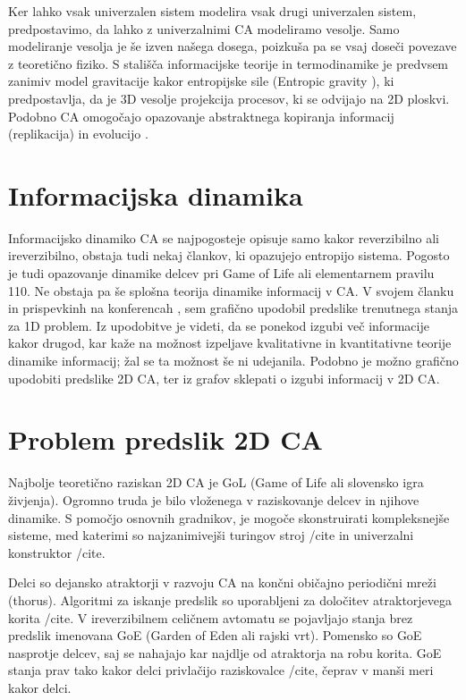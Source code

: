\documentclass[12pt,a4paper,openany]{book}
\begin{document}
Ker lahko vsak univerzalen sistem modelira vsak drugi univerzalen sistem, predpostavimo,
da lahko z univerzalnimi CA modeliramo vesolje. Samo modeliranje vesolja
je še izven našega dosega, poizkuša pa se vsaj doseči povezave z teoretično fiziko.
S stališča informacijske teorije in termodinamike je predvsem zanimiv model gravitacije
kakor entropijske sile (Entropic gravity \cite{Verlinde2010}), ki predpostavlja, da je
3D vesolje projekcija procesov, ki se odvijajo na 2D ploskvi. Podobno CA omogočajo
opazovanje abstraktnega kopiranja informacij (replikacija) in evolucijo \cite{Salzberg2004}.

\section{Informacijska dinamika}

Informacijsko dinamiko CA se najpogosteje opisuje samo kakor reverzibilno ali ireverzibilno,
obstaja tudi nekaj člankov, ki opazujejo entropijo sistema.
Pogosto je tudi opazovanje dinamike delcev pri Game of Life ali elementarnem pravilu 110.
Ne obstaja pa še splošna teorija dinamike informacij v CA.
V svojem članku \cite{JerasDobnikar2007} in prispevkinh na konferencah \cite{DBLP:conf/iccS/JerasD06, DBLP:conf/automata/Jeras08},
sem grafično upodobil predslike trenutnega stanja za 1D problem.
Iz upodobitve je videti, da se ponekod izgubi več informacije kakor drugod,
kar kaže na možnost izpeljave kvalitativne in kvantitativne teorije dinamike informacij;
žal se ta možnost še ni udejanila. Podobno je možno grafično upodobiti predslike 2D CA,
ter iz grafov sklepati o izgubi informacij v 2D CA.

\section{Problem predslik 2D CA}

Najbolje teoretično raziskan 2D CA je GoL (Game of Life ali slovensko igra živjenja).
Ogromno truda je bilo vloženega v raziskovanje delcev in njihove dinamike. S pomočjo
osnovnih gradnikov, je mogoče skonstruirati kompleksnejše sisteme, med katerimi so
najzanimivejši turingov stroj /cite{} in univerzalni konstruktor /cite{}.

Delci so dejansko atraktorji v razvoju CA na končni običajno periodični mreži (thorus).
Algoritmi za iskanje predslik so uporabljeni za določitev atraktorjevega korita /cite{}.
V ireverzibilnem celičnem avtomatu se pojavljajo stanja brez predslik imenovana GoE
(Garden of Eden ali rajski vrt). Pomensko so GoE nasprotje delcev, saj se nahajajo kar
najdlje od atraktorja na robu korita. GoE stanja prav tako kakor delci privlačijo raziskovalce /cite{},
čeprav v manši meri kakor delci.
\end{document}
